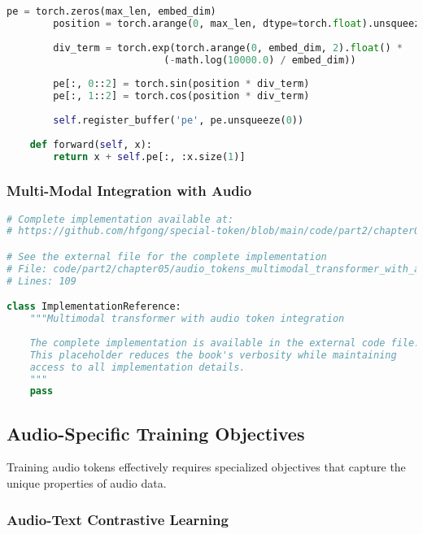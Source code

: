 \begin{lstlisting}[language=Python, caption=Audio encoder for generating audio tokens]
        pe = torch.zeros(max_len, embed_dim)
        position = torch.arange(0, max_len, dtype=torch.float).unsqueeze(1)
        
        div_term = torch.exp(torch.arange(0, embed_dim, 2).float() * 
                           (-math.log(10000.0) / embed_dim))
        
        pe[:, 0::2] = torch.sin(position * div_term)
        pe[:, 1::2] = torch.cos(position * div_term)
        
        self.register_buffer('pe', pe.unsqueeze(0))
    
    def forward(self, x):
        return x + self.pe[:, :x.size(1)]
\end{lstlisting}

\subsubsection{Multi-Modal Integration with Audio}

\begin{lstlisting}[language=Python, caption={Multimodal transformer with audio token integration}]
# Complete implementation available at:
# https://github.com/hfgong/special-token/blob/main/code/part2/chapter05/audio_tokens_multimodal_transformer_with_au.py

# See the external file for the complete implementation
# File: code/part2/chapter05/audio_tokens_multimodal_transformer_with_au.py
# Lines: 109

class ImplementationReference:
    """Multimodal transformer with audio token integration
    
    The complete implementation is available in the external code file.
    This placeholder reduces the book's verbosity while maintaining
    access to all implementation details.
    """
    pass
\end{lstlisting}

\subsection{Audio-Specific Training Objectives}

Training audio tokens effectively requires specialized objectives that capture the unique properties of audio data.

\subsubsection{Audio-Text Contrastive Learning}

